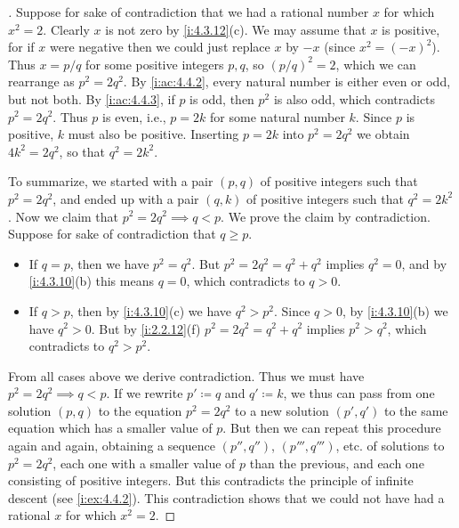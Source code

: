 \begin{proof}[]
  Suppose for sake of contradiction that we had a rational number \(x\) for which \(x^2 = 2\).
  Clearly \(x\) is not zero by \cref{i:4.3.12}(c).
  We may assume that \(x\) is positive, for if \(x\) were negative then we could just replace \(x\) by \(-x\)
  (since \(x^2 = (-x)^2\)).
  Thus \(x = p / q\) for some positive integers \(p, q\), so \((p / q)^2 = 2\), which we can rearrange as \(p^2 = 2q^2\).
  By \cref{i:ac:4.4.2}, every natural number is either even or odd, but not both.
  By \cref{i:ac:4.4.3}, if \(p\) is odd, then \(p^2\) is also odd, which contradicts \(p^2 = 2q^2\).
  Thus \(p\) is even, i.e., \(p = 2k\) for some natural number \(k\).
  Since \(p\) is positive, \(k\) must also be positive.
  Inserting \(p = 2k\) into \(p^2 = 2q^2\) we obtain \(4k^2 = 2q^2\), so that \(q^2 = 2k^2\).

  To summarize, we started with a pair \((p, q)\) of positive integers such that \(p^2 = 2q^2\), and ended up with a pair \((q, k)\) of positive integers such that \(q^2 = 2k^2\).
  Now we claim that \(p^2 = 2q^2 \implies q < p\).
  We prove the claim by contradiction.
  Suppose for sake of contradiction that \(q \geq p\).
  \begin{itemize}
    \item If \(q = p\), then we have \(p^2 = q^2\).
          But \(p^2 = 2q^2 = q^2 + q^2\) implies \(q^2 = 0\), and by \cref{i:4.3.10}(b) this means \(q = 0\), which contradicts to \(q > 0\).
    \item If \(q > p\), then by \cref{i:4.3.10}(c) we have \(q^2 > p^2\).
          Since \(q > 0\), by \cref{i:4.3.10}(b) we have \(q^2 > 0\).
          But by \cref{i:2.2.12}(f) \(p^2 = 2q^2 = q^2 + q^2\) implies \(p^2 > q^2\), which contradicts to \(q^2 > p^2\).
  \end{itemize}
  From all cases above we derive contradiction.
  Thus we must have \(p^2 = 2q^2 \implies q < p\).
  If we rewrite \(p' \coloneqq q\) and \(q' \coloneqq k\), we thus can pass from one solution \((p, q)\) to the equation \(p^2 = 2q^2\) to a new solution \((p', q')\) to the same equation which has a smaller value of \(p\).
  But then we can repeat this procedure again and again, obtaining a sequence \((p'', q'')\), \((p''', q''')\), etc. of solutions to \(p^2 = 2q^2\), each one with a smaller value of \(p\) than the previous, and each one consisting of positive integers.
  But this contradicts the principle of infinite descent (see \cref{i:ex:4.4.2}).
  This contradiction shows that we could not have had a rational \(x\) for which \(x^2 = 2\).
\end{proof}

